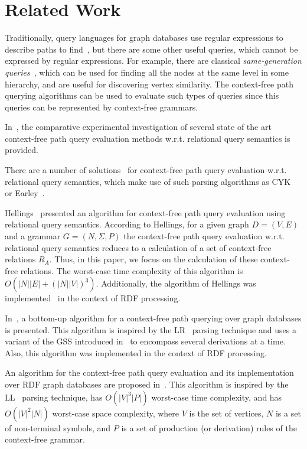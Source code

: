 \section{Related Work}
\label{section_related}
Traditionally, query languages for graph databases use regular expressions to describe paths to find~\cite{reutter2017regular,fan2011adding,abiteboul1997regular,nole2016regular,graphDB}, but there are some other useful queries, which cannot be expressed by regular expressions. For example, there are classical \emph{same-generation queries}~\cite{FndDB}, which can be used for finding all the nodes at the same level in some hierarchy, and are useful for discovering vertex similarity. The context-free path querying algorithms can be used to evaluate such types of queries since this queries can be represented by context-free grammars.  

In~\cite{kuijpers2019experimental}, the comparative experimental investigation of several state of the art context-free path query evaluation methods w.r.t. relational query semantics is provided.

There are a number of solutions~\cite{hellingsRelational,GraphQueryWithEarley,RDF} for context-free path query evaluation w.r.t. relational query semantics, which make use of such parsing algorithms as CYK~\cite{kasami,younger} or Earley~\cite{Grune}.

Hellings~\cite{hellingsRelational} presented an algorithm for context-free path query evaluation using relational query semantics. According to Hellings, for a given graph \mbox{$D = (V, E)$} and a grammar $G = (N, \Sigma, P)$ the context-free path query evaluation w.r.t. relational query semantics reduces to a calculation of a set of context-free relations $R_A$. Thus, in this paper, we focus on the calculation of these context-free relations. The worst-case time complexity of this algorithm is $O(|N||E| + (|N||V|)^3)$. Additionally, the algorithm of Hellings was implemented~\cite{RDF} in the context of RDF processing.

In~\cite{santos2018bottom}, a bottom-up algorithm for a context-free path querying over graph databases is presented. This algorithm is inspired by the LR~\cite{aho2007compilers} parsing technique and uses a variant of the GSS introduced in~\cite{tomita1987efficient} to encompass several derivations at a time. Also, this algorithm was implemented in the context of RDF processing.

An algorithm for the context-free path query evaluation and its implementation over RDF graph databases are proposed in~\cite{medeiros2019ll}. This algorithm is inspired by the LL~\cite{Grune} parsing technique, has $O(|V|^3|P|)$ worst-case time complexity, and has $O(|V|^2|N|)$ worst-case space complexity, where $V$ is the set of vertices, $N$ is a set of non-terminal symbols, and $P$ is a set of production (or derivation) rules of the context-free grammar.

